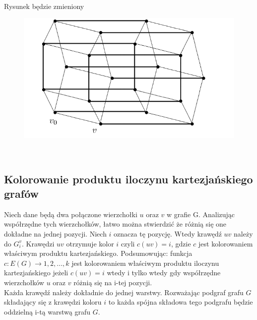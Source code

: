 \documentclass[12pt,a4paper,titlepage]{article}
\begin{document}
\\
Rysunek będzie zmieniony \\
\begin{figure}
\includegraphics{rys1.png}
\end{figure}
\\
\subsection{Kolorowanie produktu iloczynu kartezjańskiego grafów}
Niech dane będą dwa połączone wierzchołki $u$ oraz $v$ w grafie G. Analizując współrzędne tych wierzchołków, łatwo można stwierdzić że różnią się one dokładne na jednej pozycji. Niech $i$ oznacza tę pozycję. Wtedy krawędź $uv$ należy do $G_i^v$. Krawędzi $uv$ otrzymuje kolor $i$ czyli $c(uv) = i$, gdzie $c$ jest kolorowaniem właściwym produktu kartezjańskiego. Podsumowując: funkcja $c: E(G) \rightarrow {1,2,...,k}$ jest kolorowaniem właściwym produktu iloczynu kartezjańskiego jeżeli $c(uv) = i $ wtedy i tylko wtedy gdy współrzędne wierzchołków $u$ oraz $v$ różnią się na i-tej pozycji.\\
Każda krawędź należy dokładnie do jednej warstwy. Rozważając podgraf grafu $G$ składający się z krawędzi koloru $i$ to każda spójna składowa tego podgrafu będzie oddzielną i-tą warstwą grafu $G$.
\end{document}
